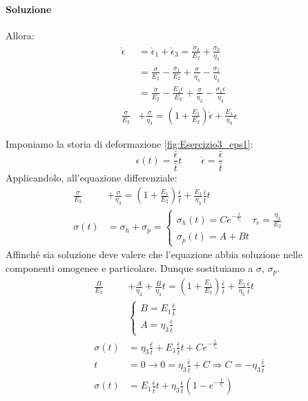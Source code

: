 \paragraph{Soluzione}
Allora:
\begin{equation}
\begin{split}
\dot{\epsilon} &= \dot{\epsilon}_1 + \dot{\epsilon}_3 = \frac{\dot{\sigma}_2}{E_2} + \frac{\dot{\sigma}_3}{\eta_3}\\
&=\frac{\dot{\sigma}}{E_2} - \frac{\dot{\sigma}_1}{E_2} + \frac{\sigma}{\eta_3} - \frac{\sigma_1}{\eta_3}\\
&= \frac{\dot{\sigma}}{E_2} - \frac{E_1\dot{\epsilon}}{E_2} + \frac{\sigma}{\eta_3} - \frac{\sigma_1\epsilon}{\eta_3}\\
\frac{\dot{\sigma}}{E_2} &+\frac{\sigma}{\eta_3} = \left(1 + \frac{E_1}{E_2}\right)\dot{\epsilon} + \frac{E_1}{\eta_3}\epsilon
\end{split}
\end{equation}

Imponiamo la storia di deformazione \ref{fig:Esercizio3_eps1}:
\begin{equation}
\epsilon(t) = \frac{\bar{\epsilon}}{\bar{t}}t \qquad \dot{\epsilon} = \frac{\bar{\epsilon}}{\bar{t}}
\end{equation}
Applicandolo, all'equazione differenziale:
\begin{equation}
\begin{split}
\frac{\dot{\sigma}}{E_2}&+\frac{\sigma}{\eta_3} = \left(1+\frac{E_1}{E_2}\right)\frac{\bar{\epsilon}}{\bar{t}} + \frac{E_1}{\eta_3}\frac{\bar{\epsilon}}{\bar{t}}t\\
\sigma(t) &= \sigma_h + \sigma_p =%
\begin{cases}
\sigma_h(t) = C e^{-\frac{t}{\tau_r}} \quad \tau_r = \frac{\eta_3}{E_2}\\
\sigma_p(t) = A+Bt
\end{cases}
\end{split}
\end{equation}
Affinché sia soluzione deve valere che l'equazione abbia soluzione nelle componenti omogenee e particolare.
Dunque sostituiamo a $\sigma$, $\sigma_p$.
\begin{equation}
\begin{split}
\frac{B}{E_2} &+ \frac{A}{\eta_3} + \frac{B}{\eta_3}t = \left(1+\frac{E_1}{E_2}\right)\frac{\bar{\epsilon}}{\bar{t}} + \frac{E_1}{\eta_3}\frac{\bar{\epsilon}}{\bar{t}}t\\
&\begin{cases}
B = E_1\frac{\bar{\epsilon}}{\bar{t}}\\
A = \eta_3 \frac{\epsilon}{\bar{t}}
\end{cases}\\
\sigma(t) &= \eta_3 \frac{\bar{\epsilon}}{\bar{t}} + E_1\frac{\bar{\epsilon}}{\bar{t}}t + C e^{-\frac{t}{\tau_r}}\\
t &= 0 \rightarrow 0 = \eta_3 \frac{\bar{\epsilon}}{\bar{t}} + C \Rightarrow C = -\eta_3\frac{\bar{\epsilon}}{\bar{t}}\\
\sigma(t) &= E_1\frac{\bar{\epsilon}}{\bar{t}}t + \eta_3\frac{\bar{\epsilon}}{\bar{t}}\left(1 - e^{-\frac{t}{\tau_r}}\right) 
\end{split}
\end{equation}

